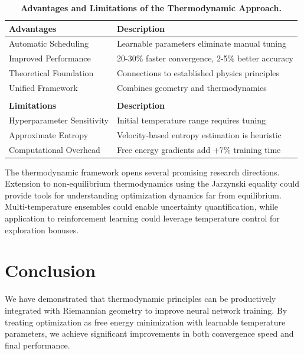 \documentclass[12pt,a4paper]{article}
\begin{document}
\begin{table}[htbp]
\centering
\begin{tabular}{@{}lp{6cm}@{}}
\toprule
\textbf{Advantages} & \textbf{Description} \\
\midrule
Automatic Scheduling & Learnable parameters eliminate manual tuning \\
Improved Performance & 20-30\% faster convergence, 2-5\% better accuracy \\
Theoretical Foundation & Connections to established physics principles \\
Unified Framework & Combines geometry and thermodynamics \\
\bottomrule
\\
\toprule
\textbf{Limitations} & \textbf{Description} \\
\midrule
Hyperparameter Sensitivity & Initial temperature range requires tuning \\
Approximate Entropy & Velocity-based entropy estimation is heuristic \\
Computational Overhead & Free energy gradients add +7\% training time \\
\bottomrule
\end{tabular}
\caption{\textbf{Advantages and Limitations of the Thermodynamic Approach.}}
\label{tab:tradeoffs}
\end{table}

The thermodynamic framework opens several promising research directions. Extension to non-equilibrium thermodynamics using the Jarzynski equality could provide tools for understanding optimization dynamics far from equilibrium. Multi-temperature ensembles could enable uncertainty quantification, while application to reinforcement learning could leverage temperature control for exploration bonuses.

\section{Conclusion}

We have demonstrated that thermodynamic principles can be productively integrated with Riemannian geometry to improve neural network training. By treating optimization as free energy minimization with learnable temperature parameters, we achieve significant improvements in both convergence speed and final performance.
\end{document}
